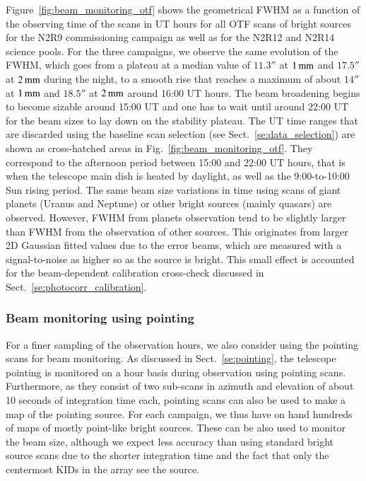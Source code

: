 Figure~\ref{fig:beam_monitoring_otf} shows the geometrical FWHM as a
function of the observing time of the scans in UT hours for all OTF
scans of bright sources for the N2R9 commissioning campaign as well
as for the N2R12 and N2R14 science pools. For the three campaigns, we
observe the same evolution of the FWHM, which goes from a plateau at a
median value of $11.3''$ at $1\,\rm{mm}$ and $17.5''$ at $2\,\rm{mm}$
during the night, to a smooth rise that reaches a maximum of about $14''$
at $1\,\rm{mm}$ and $18.5''$ at $2\,\rm{mm}$ around 16:00 UT
hours. The beam broadening begins to become sizable around 15:00 UT
and one has to wait until around 22:00 UT for the beam sizes to lay
down on the stability plateau. The UT time ranges that are discarded
using the baseline scan selection (see
Sect.~\ref{se:data_selection}) are shown as cross-hatched areas in
Fig.~\ref{fig:beam_monitoring_otf}. They correspond to the afternoon
period between 15:00 and 22:00 UT hours, that is when the
telescope main dish is heated by daylight, as well as the
9:00-to-10:00 Sun rising period. The same beam size variations in time
using scans of giant planets (Uranus and Neptune) or other bright
sources (mainly quasars) are observed. However, FWHM from planets
observation tend to be slightly larger than FWHM from the observation
of other sources. This originates from larger 2D Gaussian fitted
values due to the error beams, which are measured with a
signal-to-noise as higher so as the source is bright. This small
effect is accounted for the beam-dependent calibration cross-check
discussed in Sect.~\ref{se:photocorr_calibration}.


\subsubsection{Beam monitoring using pointing}
\label{se:beam_monitoring_pointing}

For a finer sampling of the observation hours, we also consider using
the pointing scans for beam monitoring. As discussed in
Sect.~\ref{se:pointing}, the telescope pointing is
monitored on a hour basis during observation using pointing
scans. Furthermore, as they consist of two sub-scans in azimuth and
elevation of about 10 seconds of integration time each, pointing scans
can also be used to make a map of the pointing source. For each campaign,
we thus have on hand hundreds of maps of mostly point-like bright
sources. These can be also used to monitor the beam size, although we
expect less accuracy than using standard bright source scans due to the
shorter integration time and the fact that only the centermost KIDs in
the array see the source.  

